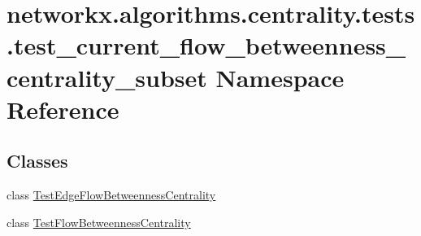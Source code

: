 \hypertarget{namespacenetworkx_1_1algorithms_1_1centrality_1_1tests_1_1test__current__flow__betweenness__centrality__subset}{}\section{networkx.\+algorithms.\+centrality.\+tests.\+test\+\_\+current\+\_\+flow\+\_\+betweenness\+\_\+centrality\+\_\+subset Namespace Reference}
\label{namespacenetworkx_1_1algorithms_1_1centrality_1_1tests_1_1test__current__flow__betweenness__centrality__subset}
\subsection*{Classes}
\begin{DoxyCompactItemize}
\item 
class \hyperlink{classnetworkx_1_1algorithms_1_1centrality_1_1tests_1_1test__current__flow__betweenness__centraliab4e733e7ce761709e531cfb6e08ef7a}{Test\+Edge\+Flow\+Betweenness\+Centrality}
\item 
class \hyperlink{classnetworkx_1_1algorithms_1_1centrality_1_1tests_1_1test__current__flow__betweenness__centralib3c1da27deaacbf64e13c5acae21dc9e}{Test\+Flow\+Betweenness\+Centrality}
\end{DoxyCompactItemize}
